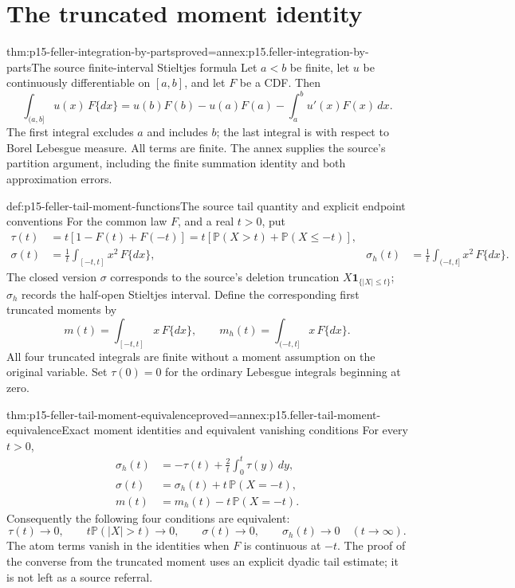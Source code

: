 \section{The truncated moment identity}
\label{sec:p15-feller-truncated-moment}

\begin{hbtheorem}{thm:p15-feller-integration-by-parts}{proved=annex:p15.feller-integration-by-parts}{The source finite-interval Stieltjes formula}
Let \(a<b\) be finite, let \(u\) be continuously differentiable
on \([a,b]\), and let \(F\) be a CDF. Then
\[
 \int_{(a,b]}u(x)\,F\{dx\}
 =u(b)F(b)-u(a)F(a)-\int_a^b u'(x)F(x)\,dx.
\]
The first integral excludes \(a\) and includes \(b\); the last
integral is with respect to Borel Lebesgue measure. All terms are
finite. The annex supplies the source's partition argument, including
the finite summation identity and both approximation errors.
\end{hbtheorem}

\begin{hbdefinition}{def:p15-feller-tail-moment-functions}{The source tail quantity and explicit endpoint conventions}
For the common law \(F\), and a real \(t>0\), put
\[
 \begin{aligned}
 \tau(t)&=t[1-F(t)+F(-t)]
       =t[\mathbb P(X>t)+\mathbb P(X\leq-t)],\\
 \sigma(t)&=\frac1t\int_{[-t,t]}x^2\,F\{dx\},&
 \sigma_h(t)&=\frac1t\int_{(-t,t]}x^2\,F\{dx\}.
 \end{aligned}
\]
The closed version \(\sigma\) corresponds to the source's deletion
truncation \(X\mathbf1_{\{|X|\leq t\}}\); \(\sigma_h\) records
the half-open Stieltjes interval. Define the corresponding first
truncated moments by
\[
 m(t)=\int_{[-t,t]}x\,F\{dx\},\qquad
 m_h(t)=\int_{(-t,t]}x\,F\{dx\}.
\]
All four truncated integrals are finite without a moment assumption
on the original variable. Set \(\tau(0)=0\) for the ordinary
Lebesgue integrals beginning at zero.
\end{hbdefinition}

\begin{hbtheorem}{thm:p15-feller-tail-moment-equivalence}{proved=annex:p15.feller-tail-moment-equivalence}{Exact moment identities and equivalent vanishing conditions}
For every \(t>0\),
\[
 \begin{aligned}
 \sigma_h(t)&=-\tau(t)+\frac2t\int_0^t\tau(y)\,dy,\\
 \sigma(t)&=\sigma_h(t)+t\,\mathbb P(X=-t),\\
 m(t)&=m_h(t)-t\,\mathbb P(X=-t).
 \end{aligned}
\]
Consequently the following four conditions are equivalent:
\[
 \tau(t)\to0,\qquad
 t\mathbb P(|X|>t)\to0,\qquad
 \sigma(t)\to0,\qquad
 \sigma_h(t)\to0
                         \quad(t\to\infty).
\]
The atom terms vanish in the identities when \(F\) is continuous at
\(-t\). The proof of the converse from the truncated moment uses an
explicit dyadic tail estimate; it is not left as a source referral.
\end{hbtheorem}

